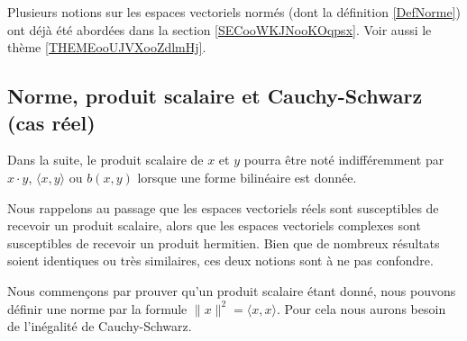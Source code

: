 
Plusieurs notions sur les espaces vectoriels normés (dont la définition \ref{DefNorme}) ont déjà été abordées dans la section \ref{SECooWKJNooKOqpsx}. Voir aussi le thème \ref{THEMEooUJVXooZdlmHj}.

\subsection{Norme, produit scalaire et Cauchy-Schwarz (cas réel)}

Dans la suite, le produit scalaire de \( x\) et \( y\) pourra être noté indifféremment par \( x\cdot y\), \( \langle x, y\rangle \) ou \( b(x,y)\) lorsque une forme bilinéaire est donnée.

Nous rappelons au passage que les espaces vectoriels réels sont susceptibles de recevoir un produit scalaire, alors que les espaces vectoriels complexes sont susceptibles de recevoir un produit hermitien. Bien que de nombreux résultats soient identiques ou très similaires, ces deux notions sont à ne pas confondre.

Nous commençons par prouver qu'un produit scalaire étant donné, nous pouvons définir une norme par la formule \( \| x \|^2=\langle x, x\rangle \). Pour cela nous aurons besoin de l'inégalité de Cauchy-Schwarz.

